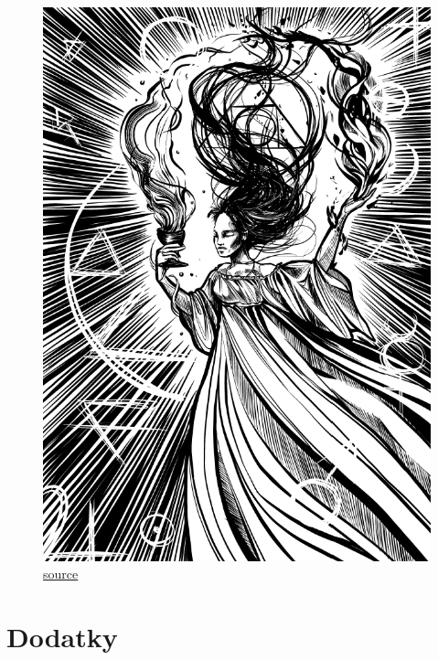 \documentclass[12pt,a4paper,twoside,openany]{book}
\begin{document}
\begin{figure}[h!]
  \centering
  \caption{\href{https://petrakubaskova.cz/wp-content/uploads/2024/07/elixir-cze.png}{source}}
  \includegraphics[width=\textwidth]{carodejka}
\end{figure}







\chapter{Dodatky}
\label{chap:dodatky}
\end{document}
